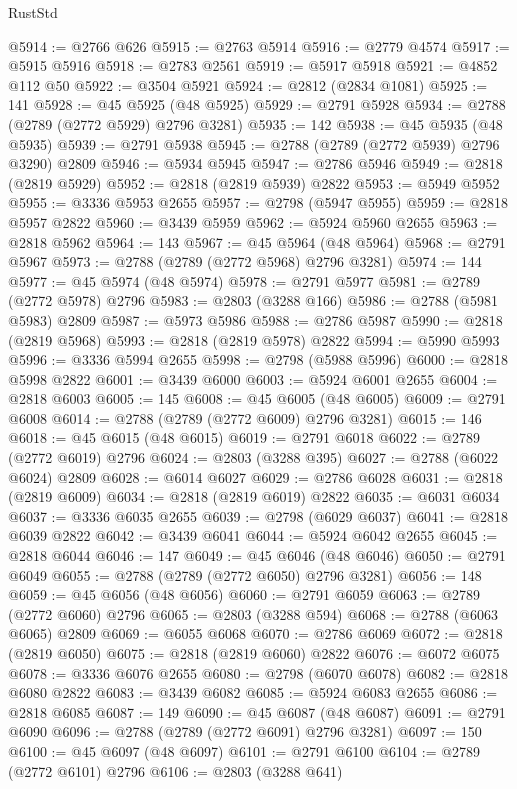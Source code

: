 \begin{lexlean}{RustStd}
\begin{coremodule}
@5914 := @2766 @626
@5915 := @2763 @5914
@5916 := @2779 @4574
@5917 := @5915 @5916
@5918 := @2783 @2561
@5919 := @5917 @5918
@5921 := @4852 @112 @50
@5922 := @3504 @5921
@5924 := @2812 (@2834 @1081)
@5925 := 141
@5928 := @45 @5925 (@48 @5925)
@5929 := @2791 @5928
@5934 := @2788 (@2789 (@2772 @5929) @2796 @3281)
@5935 := 142
@5938 := @45 @5935 (@48 @5935)
@5939 := @2791 @5938
@5945 := @2788 (@2789 (@2772 @5939) @2796 @3290) @2809
@5946 := @5934 @5945
@5947 := @2786 @5946
@5949 := @2818 (@2819 @5929)
@5952 := @2818 (@2819 @5939) @2822
@5953 := @5949 @5952
@5955 := @3336 @5953 @2655
@5957 := @2798 (@5947 @5955)
@5959 := @2818 @5957 @2822
@5960 := @3439 @5959
@5962 := @5924 @5960 @2655
@5963 := @2818 @5962
@5964 := 143
@5967 := @45 @5964 (@48 @5964)
@5968 := @2791 @5967
@5973 := @2788 (@2789 (@2772 @5968) @2796 @3281)
@5974 := 144
@5977 := @45 @5974 (@48 @5974)
@5978 := @2791 @5977
@5981 := @2789 (@2772 @5978) @2796
@5983 := @2803 (@3288 @166)
@5986 := @2788 (@5981 @5983) @2809
@5987 := @5973 @5986
@5988 := @2786 @5987
@5990 := @2818 (@2819 @5968)
@5993 := @2818 (@2819 @5978) @2822
@5994 := @5990 @5993
@5996 := @3336 @5994 @2655
@5998 := @2798 (@5988 @5996)
@6000 := @2818 @5998 @2822
@6001 := @3439 @6000
@6003 := @5924 @6001 @2655
@6004 := @2818 @6003
@6005 := 145
@6008 := @45 @6005 (@48 @6005)
@6009 := @2791 @6008
@6014 := @2788 (@2789 (@2772 @6009) @2796 @3281)
@6015 := 146
@6018 := @45 @6015 (@48 @6015)
@6019 := @2791 @6018
@6022 := @2789 (@2772 @6019) @2796
@6024 := @2803 (@3288 @395)
@6027 := @2788 (@6022 @6024) @2809
@6028 := @6014 @6027
@6029 := @2786 @6028
@6031 := @2818 (@2819 @6009)
@6034 := @2818 (@2819 @6019) @2822
@6035 := @6031 @6034
@6037 := @3336 @6035 @2655
@6039 := @2798 (@6029 @6037)
@6041 := @2818 @6039 @2822
@6042 := @3439 @6041
@6044 := @5924 @6042 @2655
@6045 := @2818 @6044
@6046 := 147
@6049 := @45 @6046 (@48 @6046)
@6050 := @2791 @6049
@6055 := @2788 (@2789 (@2772 @6050) @2796 @3281)
@6056 := 148
@6059 := @45 @6056 (@48 @6056)
@6060 := @2791 @6059
@6063 := @2789 (@2772 @6060) @2796
@6065 := @2803 (@3288 @594)
@6068 := @2788 (@6063 @6065) @2809
@6069 := @6055 @6068
@6070 := @2786 @6069
@6072 := @2818 (@2819 @6050)
@6075 := @2818 (@2819 @6060) @2822
@6076 := @6072 @6075
@6078 := @3336 @6076 @2655
@6080 := @2798 (@6070 @6078)
@6082 := @2818 @6080 @2822
@6083 := @3439 @6082
@6085 := @5924 @6083 @2655
@6086 := @2818 @6085
@6087 := 149
@6090 := @45 @6087 (@48 @6087)
@6091 := @2791 @6090
@6096 := @2788 (@2789 (@2772 @6091) @2796 @3281)
@6097 := 150
@6100 := @45 @6097 (@48 @6097)
@6101 := @2791 @6100
@6104 := @2789 (@2772 @6101) @2796
@6106 := @2803 (@3288 @641)

\end{coremodule}
\end{lexlean}
